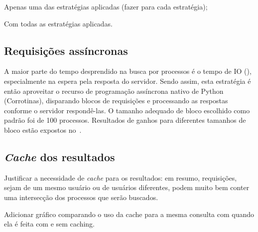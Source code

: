 
\begin{todolist}
    \item Apenas uma das estratégias aplicadas (fazer para cada estratégia);
    \item Com todas as estratégias aplicadas.
\end{todolist}

\subsection{Requisições assíncronas}

A maior parte do tempo desprendido na busca por processos é o tempo de IO
(), especialmente na espera pela resposta do
servidor. Sendo assim, esta estratégia é então aproveitar o recurso de
programação assíncrona nativo de Python (Corrotinas), disparando blocos de
requisições e processando as respostas conforme o servidor respondê-las. O
tamanho adequado de bloco escolhido como padrão foi de 100 processos.
Resultados de ganhos para diferentes tamanhos de bloco estão expostos
no~.

\subsection{\textit{Cache} dos resultados}

\begin{todolist}
    \item Justificar a necessidade de \textit{cache} para os resultados: em
          resumo, requisições, sejam de um mesmo usuário ou de usuários
          diferentes, podem muito bem conter uma intersecção dos processos que
          serão buscados.
    \item Adicionar gráfico comparando o uso da cache para a mesma consulta com
          quando ela é feita com e sem caching.
\end{todolist}

